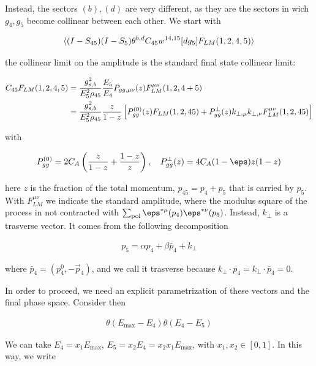 \documentclass[11pt]{report}
\begin{document}
Instead, the sectors \((b), (d)\) are very different, as they are the sectors in wich \(g_4, g_5\) become collinear between each other. We start with 

\begin{align}
    \braket{(I-S_{45})(I-S_5)\theta^{b, d}C_{45}w^{14, 15}[dg_5]F_{LM}(1, 2, 4, 5)}
\end{align}

the collinear limit on the amplitude is the standard final state collinear limit: 

\begin{align}
    C_{45}F_{LM}(1, 2, 4, 5) &= \frac{g^2_{s, b}}{E_5^2 \rho_{45}}\frac{E_5}{E_4}P_{gg, \mu\nu}(z)F^{\mu\nu}_{LM}(1, 2, 4+5) \notag \\ 
    &= \frac{g^2_{s, b}}{E_5^2 \rho_{45}}\frac{z}{1-z}\left[P^{(0)}_{gg}(z)F_{LM}(1, 2, 45) + P_{gg}^\perp(z)k_{\perp, \mu}k_{\perp, \nu}F^{\mu\nu}_{LM}(1, 2, 45) \right]
\end{align}

with 

\begin{align}
    P^{(0)}_{gg} = 2C_A \left( \frac{z}{1-z} + \frac{1-z}{z} \right), \quad P^\perp_{gg}(z) = 4C_A(1-\eps)z(1-z)
\end{align}

here \(z\) is the fraction of the total momentum, \(p_{45} = p_4 + p_5\) that is carried by \(p_5\). With \(F_{LM}^{\mu\nu}\) we indicate the standard amplitude, where the modulus square of the process in not contracted with \(\sum_{\text{pol}}\eps^{*\mu}(p_4)\eps^{*\nu}(p_5)\). Instead, \(k_\perp\) is a trasverse vector. It comes from the following decomposition 

\begin{align}
    p_5 = \alpha p_4 + \beta \bar{p}_4 + k_\perp 
\end{align}

where \(\bar{p}_4 = (p_4^0, -\vec{p}_4)\), and we call it trasverse because \(k_\perp \cdot p_4 = k_\perp \cdot \bar{p}_4 = 0\). 

In order to proceed, we need an explicit parametrization of these vectors and the final phase space. Consider then 

\begin{align}
    [dg_4][dg_5]\theta(E_{\max}-E_4)\theta(E_4 - E_5)
\end{align}

We can take \(E_4 = x_1 E_{\max}\), \(E_5 = x_2 E_4 = x_2 x_1 E_{\max}\), with \(x_1, x_2 \in [0, 1]\). In this way, we write 
\end{document}
